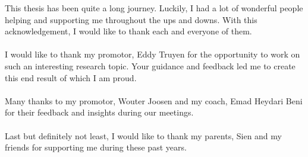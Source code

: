 \documentclass[master=cws,masteroption=gs]{config/kulemt}
\begin{document}
\renewcommand{\prefacename}{Acknowledgements}
\begin{preface}
This thesis has been quite a long journey. Luckily,  I had a lot of wonderful people helping and supporting me throughout the ups and downs.  With this acknowledgement, I would like to thank each and everyone of them.\\\\
I would like to thank my promotor, Eddy Truyen for the opportunity to work on such an interesting research topic. Your guidance and feedback led me to create this end result of which I am proud.\\\\
Many thanks to my promotor, Wouter Joosen and my coach, Emad Heydari Beni for their feedback and insights during our meetings.\\\\ 
Last but definitely not least, I would like to thank my parents, Sien and my friends for supporting me during these past years. 
 
\end{preface}

\tableofcontents*
\end{document}

